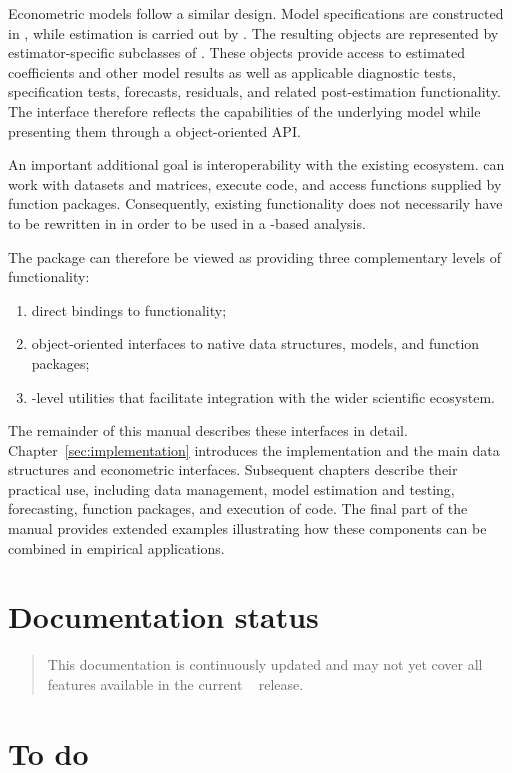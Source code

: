 Econometric models follow a similar design. Model specifications are
constructed in \python, while estimation is carried out by \lgretl.
The resulting objects are represented by estimator-specific subclasses
of \classpymodel. These objects provide access to estimated
coefficients and other model results as well as applicable diagnostic
tests, specification tests, forecasts, residuals, and related
post-estimation functionality. The interface therefore reflects the
capabilities of the underlying \gretl model while presenting them
through a \python object-oriented API.

An important additional goal is interoperability with the existing
\gretl ecosystem. \gretlpy can work with \gretl datasets and matrices,
execute \hansl code, and access functions supplied by \gretl function
packages. Consequently, existing \gretl functionality does not
necessarily have to be rewritten in \python in order to be used in a
\python-based analysis.

The package can therefore be viewed as providing three complementary
levels of functionality:
\begin{enumerate}
	\item direct bindings to \lgretl functionality;
	\item object-oriented interfaces to native \gretl data structures,
	models, and function packages;
	\item \python-level utilities that facilitate integration with
	the wider scientific \python ecosystem.
\end{enumerate}

The remainder of this manual describes these interfaces in detail.
Chapter~\ref{sec:implementation} introduces the implementation and the
main \gretlpy data structures and econometric interfaces. Subsequent
chapters describe their practical use, including data management,
model estimation and testing, forecasting, function packages, and
execution of \hansl code. The final part of the manual provides
extended examples illustrating how these components can be combined
in empirical applications.


\section*{Documentation status}

\begin{quote}
	This documentation is continuously updated and may not yet cover
	all features available in the current \gretlpy~\gretlpyversion
	release.
\end{quote}


\section*{To do}

\begin{quote}
	
\end{quote}